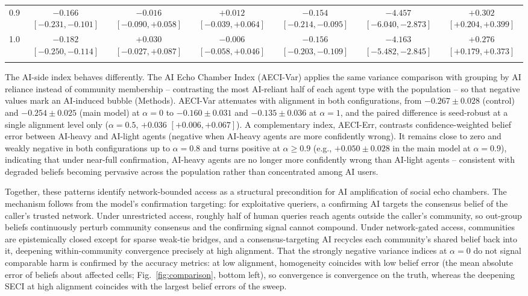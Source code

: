 \documentclass[pdflatex,sn-basic]{sn-jnl}
\begin{document}
\begin{table}[h]
{\begin{tabular}{@{}lcccccc@{}}
0.9 & $\mathbf{-0.166}$ $[-0.231, -0.101]$ & $-0.016$ $[-0.090, +0.058]$ & $+0.012$ $[-0.039, +0.064]$ & $\mathbf{-0.154}$ $[-0.214, -0.095]$ & $\mathbf{-4.457}$ $[-6.040, -2.873]$ & $\mathbf{+0.302}$ $[+0.204, +0.399]$ \\
1.0 & $\mathbf{-0.182}$ $[-0.250, -0.114]$ & $+0.030$ $[-0.027, +0.087]$ & $-0.006$ $[-0.058, +0.046]$ & $\mathbf{-0.156}$ $[-0.203, -0.109]$ & $\mathbf{-4.163}$ $[-5.482, -2.845]$ & $\mathbf{+0.276}$ $[+0.179, +0.373]$ \\
\botrule
\end{tabular}}
\end{table}

The AI-side index behaves differently. The AI Echo Chamber Index (AECI-Var) applies the same variance comparison with grouping by AI reliance instead of community membership -- contrasting the most AI-reliant half of each agent type with the population -- so that negative values mark an AI-induced bubble (Methods). AECI-Var attenuates with alignment in both configurations, from $-0.267 \pm 0.028$ (control) and $-0.254 \pm 0.025$ (main model) at $\alpha = 0$ to $-0.160 \pm 0.031$ and $-0.135 \pm 0.036$ at $\alpha = 1$, and the paired difference is seed-robust at a single alignment level only ($\alpha = 0.5$, $+0.036$ $[+0.006, +0.067]$). A complementary index, AECI-Err, contrasts confidence-weighted belief error between AI-heavy and AI-light agents (negative when AI-heavy agents are more confidently wrong). It remains close to zero and weakly negative in both configurations up to $\alpha = 0.8$ and turns positive at $\alpha \geq 0.9$ (e.g., $+0.050 \pm 0.028$ in the main model at $\alpha = 0.9$), indicating that under near-full confirmation, AI-heavy agents are no longer more confidently wrong than AI-light agents -- consistent with degraded beliefs becoming pervasive across the population rather than concentrated among AI users.

Together, these patterns identify network-bounded access as a structural precondition for AI amplification of social echo chambers. The mechanism follows from the model's confirmation targeting: for exploitative queriers, a confirming AI targets the consensus belief of the caller's trusted network. Under unrestricted access, roughly half of human queries reach agents outside the caller's community, so out-group beliefs continuously perturb community consensus and the confirming signal cannot compound. Under network-gated access, communities are epistemically closed except for sparse weak-tie bridges, and a consensus-targeting AI recycles each community's shared belief back into it, deepening within-community convergence precisely at high alignment. That the strongly negative variance indices at $\alpha = 0$ do not signal comparable harm is confirmed by the accuracy metrics: at low alignment, homogeneity coincides with low belief error (the mean absolute error of beliefs about affected cells; Fig.~\ref{fig:comparison}, bottom left), so convergence is convergence on the truth, whereas the deepening SECI at high alignment coincides with the largest belief errors of the sweep.
\end{document}
